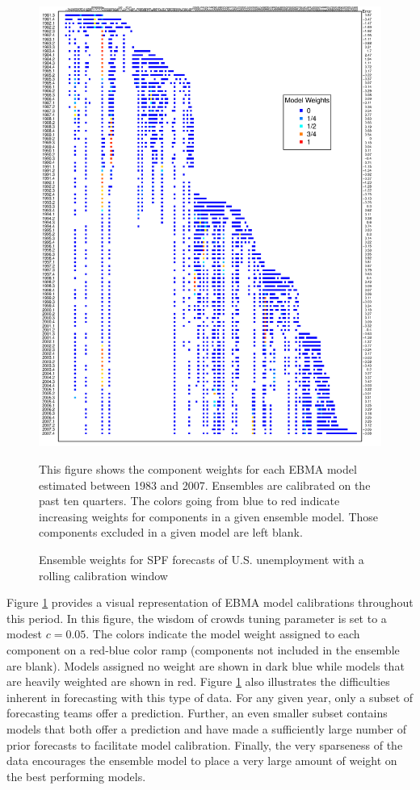 \documentclass[12pt,fullpage,endnotes]{article}
\begin{document}
\begin{figure}[h]
  \caption{Ensemble weights for SPF forecasts of U.S. unemployment
    with a rolling calibration window}
\label{modelWeights}
\begin{center}
\includegraphics[scale=.90]{awesome}
\end{center}

\footnotesize This figure shows the component weights for each EBMA
model estimated between 1983 and 2007. Ensembles are calibrated on the
past ten quarters. The colors going from blue to red indicate
increasing weights for components in a given ensemble model. Those
components excluded in a given model are left blank.

\end{figure}

Figure \ref{modelWeights} provides a visual representation of EBMA
model calibrations throughout this period.  In this figure, the wisdom
of crowds tuning parameter is set to a modest $c=0.05$.  The colors
indicate the model weight assigned to each component on a red-blue
color ramp (components not included in the ensemble are blank).
Models assigned no weight are shown in dark blue while models that are
heavily weighted are shown in red. Figure \ref{modelWeights} also illustrates
the difficulties inherent in
forecasting with this type of data.  For any given year, only a subset
of forecasting teams offer a prediction.  Further, an even smaller
subset contains models that both offer a prediction and have made a
sufficiently large number of prior forecasts to facilitate model
calibration.  Finally, the very sparseness of the data encourages the
ensemble model to place a very large amount of weight on the best
performing models.  
\end{document}
